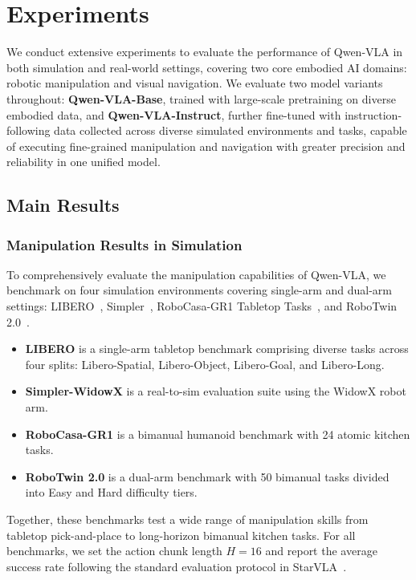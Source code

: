 \documentclass{llmxive}
\begin{document}
\section{Experiments}


We conduct extensive experiments to evaluate the performance of Qwen-VLA in both simulation and real-world settings, covering two core embodied AI domains: robotic manipulation and visual navigation. We evaluate two model variants throughout: \textbf{Qwen-VLA-Base}, trained with large-scale pretraining on diverse embodied data, and \textbf{Qwen-VLA-Instruct}, further fine-tuned with instruction-following data collected across diverse simulated environments and tasks, capable of executing fine-grained manipulation and navigation with greater precision and reliability in one unified model.                                     


\subsection{Main Results}

\subsubsection{Manipulation Results in Simulation}

To comprehensively evaluate the manipulation capabilities of Qwen-VLA, we benchmark on four simulation environments covering single-arm and dual-arm settings: LIBERO~\citep{liu2023libero}, Simpler~\citep{li2024simpler}, RoboCasa-GR1 Tabletop Tasks~\citep{nasiriany2024robocasa}, and RoboTwin 2.0~\citep{mu2025robotwin}. 


\begin{itemize}[leftmargin=*,itemsep=2pt]
\item \textbf{LIBERO} is a single-arm tabletop benchmark comprising diverse tasks across four splits: Libero-Spatial, Libero-Object, Libero-Goal, and Libero-Long.

\item \textbf{Simpler-WidowX} is a real-to-sim evaluation suite using the WidowX robot arm. 

\item \textbf{RoboCasa-GR1} is a bimanual humanoid benchmark with 24 atomic kitchen tasks. 

\item \textbf{RoboTwin 2.0} is a dual-arm benchmark with 50 bimanual tasks divided into Easy and Hard difficulty tiers.
\end{itemize}
Together, these benchmarks test a wide range of manipulation skills from tabletop pick-and-place to long-horizon bimanual kitchen tasks. For all benchmarks, we set the action chunk length $H=16$ and report the average success rate following the standard evaluation protocol in StarVLA~\citep{community2026starvla}.
\end{document}
